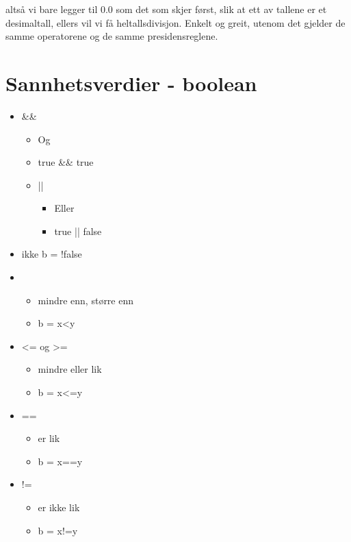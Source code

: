 \documentclass[11pt]{article}
\begin{document}
   altså vi bare legger til 0.0 som det som skjer først, slik at ett av tallene er
   et desimaltall, ellers vil vi få heltallsdivisjon. Enkelt og greit,
   utenom det gjelder de samme operatorene og de samme presidensreglene.
\section{Sannhetsverdier - boolean}
\label{sec-2}




\begin{itemize}
\item \&\&

\begin{itemize}
\item Og
\item true \&\& true
\item ||

\begin{itemize}
\item Eller
\item true || false
\end{itemize}

\end{itemize}

\item ikke
       b = !false
\item < og >

\begin{itemize}
\item mindre enn, større enn
\item b = x<y
\end{itemize}

\item <= og >=

\begin{itemize}
\item mindre eller lik
\item b = x<=y
\end{itemize}

\item ==

\begin{itemize}
\item er lik
\item b = x==y
\end{itemize}

\item !=

\begin{itemize}
\item er ikke lik
\item b = x!=y
\end{itemize}

\end{itemize}
\end{document}
